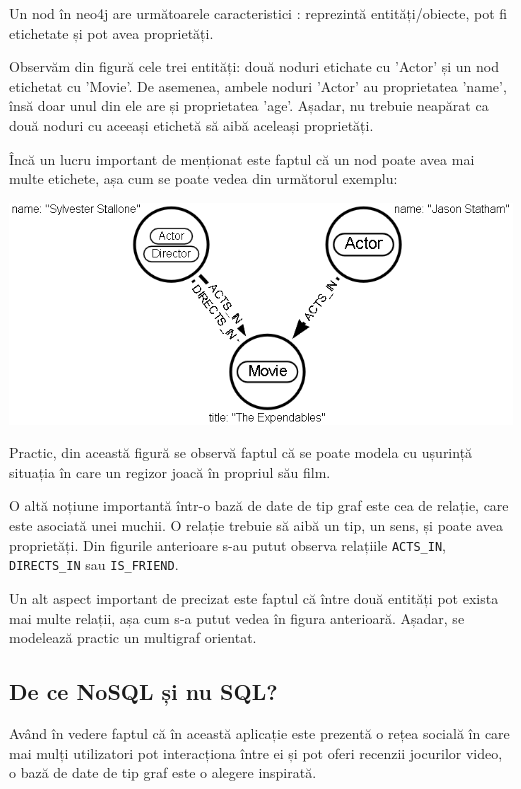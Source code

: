 \documentclass[12pt,a4paper]{report}
\begin{document}
Un nod în neo4j are următoarele caracteristici \cite{6}: reprezintă entități/obiecte, pot fi etichetate și pot avea proprietăți.

Observăm din figură cele trei entități: două noduri etichate cu 'Actor' și un nod etichetat cu 'Movie'. De asemenea, ambele noduri 'Actor' au proprietatea 'name', însă doar unul din ele are și proprietatea 'age'. Așadar, nu trebuie neapărat ca două noduri cu aceeași etichetă să aibă aceleași proprietăți.

Încă un lucru important de menționat este faptul că un nod poate avea mai multe etichete, așa cum se poate vedea din următorul exemplu:

\hfill \break
\hfill \break
\hfill \break
\includegraphics[scale=0.5]{exemplu_2_neo4j}
\hfill \break
\hfill \break
\hfill \break

Practic, din această figură se observă faptul că se poate modela cu ușurință situația în care un regizor joacă în propriul său film.

O altă noțiune importantă într-o bază de date de tip graf este cea de relație, care este asociată unei muchii. 
O relație trebuie să aibă un tip, un sens, și poate avea proprietăți.
Din figurile anterioare s-au putut observa relațiile \texttt{ACTS\_IN}, \texttt{DIRECTS\_IN} sau \texttt{IS\_FRIEND}.

Un alt aspect important de precizat este faptul că între două entități pot exista mai multe relații, așa cum s-a putut vedea în figura anterioară. Așadar, se modelează practic un multigraf orientat.

\subsection{De ce NoSQL și nu SQL?}

Având în vedere faptul că în această aplicație este prezentă o rețea socială în care mai mulți utilizatori pot interacționa între ei și pot oferi recenzii jocurilor video, o bază de date de tip graf este o alegere inspirată.
\end{document}
